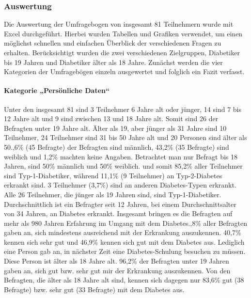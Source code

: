 \documentclass[a4paper,11pt]{article}%
\renewcommand{\\}{\vspace*{0.5\baselineskip} \newline}
\begin{document}
\subsubsection{Auswertung}
	Die Auswertung der Umfragebogen von insgesamt 81 Teilnehmern wurde mit Excel durchgeführt. Hierbei wurden Tabellen und Grafiken verwendet, um einen möglichst schnellen und einfachen Überblick der verschiedenen Fragen zu erhalten. Berücksichtigt wurden die zwei verschiedenen Zielgruppen, Diabetiker bis 19 Jahren und Diabetiker älter als 18 Jahre.
	Zunächst werden die vier Kategorien der Umfragebögen einzeln ausgewertet und folglich ein Fazit verfasst.
\paragraph{Kategorie „Persönliche Daten“}\mbox{}\\
	Unter den insgesamt 81 sind 3 Teilnehmer 6 Jahre alt oder jünger, 14 sind 7 bis 12 Jahre alt und 9 sind zwischen 13 und 18 Jahre alt. Somit sind 26 der Befragten unter 19 Jahre alt. Älter als 19, aber jünger als 31 Jahre sind 10 Teilnehmer, 24 Teilnehmer sind 31 bis 50 Jahre alt und 20 Personen sind älter als 50.,6\% (45 Befragte) der Befragten sind männlich, 43,2\% (35 Befragte) sind weiblich und 1,2\% machten keine Angaben. Betrachtet man nur Befragt bis 18 Jahren, sind 50\% männlich und 50\% weiblich. und somit 85,2\% aller Teilnehmer sind Typ-1-Diabetiker, während 11,1\% (9 Teilnehmer) an Typ-2-Diabetes erkrankt sind. 3 Teilnehmer (3,7\%) sind an anderen Diabetes-Typen erkrankt. Alle 26 Teilnehmer, die jünger als 19 Jahren sind, sind Typ-1-Diabetiker.\newline
	Durchschnittlich ist ein Befragter seit 12 Jahren, bei einem Durchschnittsalter von 34 Jahren, an Diabetes erkrankt. Insgesamt bringen es die Befragten auf mehr als 980 Jahren Erfahrung im Umgang mit dem Diabetes.,8\% aller Befragten gaben an, sich mindestens ausreichend mit der Erkrankung auszukennen. 40,7\% kennen sich sehr gut und 46,9\% kennen sich gut mit dem Diabetes aus. Lediglich eine Person gab an, in nächster Zeit eine Diabetes-Schulung besuchen zu müssen.\newline
	Diese Person ist älter als 18 Jahre alt. 96,2\% der Befragten unter 19 Jahren gaben an, sich gut bzw. sehr gut mir der Erkrankung auszukennen. Von den Befragten, die älter als 18 Jahre alt sind, kennen sich dagegen nur 83,6\% gut (38 Befragte) bzw. sehr gut (33 Befragte) mit dem Diabetes aus.\newline
\end{document}
